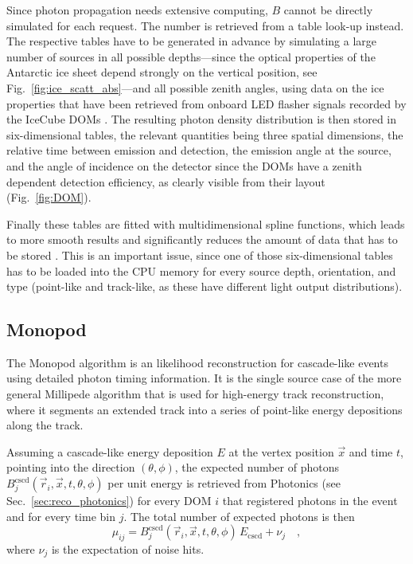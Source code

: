 Since photon propagation needs extensive computing, $B$ cannot be directly
simulated for each request. The number is retrieved from a table look-up
instead. The respective tables have to be generated in advance by simulating a
large number of sources in all possible depths---since the optical properties
of the Antarctic ice sheet depend strongly on the vertical position, see
Fig.~\ref{fig:ice_scatt_abs}---and all possible zenith angles, using data on the
ice properties that have been retrieved from onboard LED flasher signals
recorded by the IceCube DOMs \cite{Dima}. The resulting photon density
distribution is then stored in six-dimensional tables, the relevant quantities
being three spatial dimensions, the relative time between emission and
detection, the emission angle at the source, and the angle of incidence on the
detector since the DOMs have a zenith dependent detection efficiency, as clearly
visible from their layout (Fig.~\ref{fig:DOM}).

Finally these tables are fitted with multidimensional spline functions, which
leads to more smooth results and significantly reduces the amount of data that
has to be stored \cite{Dima}. This is an important issue, since one of those
six-dimensional tables has to be loaded into the CPU memory for every source
depth, orientation, and type (point-like and track-like, as these have
different light output distributions).

\subsection{Monopod}
\label{sec:reco_monopod}

The Monopod algorithm is an likelihood reconstruction for cascade-like events
using detailed photon timing information. It is the single source case of the
more general Millipede algorithm \cite{Millipede} that is used for high-energy
track reconstruction, where it segments an extended track into a series of
point-like energy depositions along the track.

Assuming a cascade-like energy deposition $E$ at the vertex position $\vec{x}$
and time $t$, pointing into the direction $(\theta, \phi)$, the expected number
of photons $B^\mathrm{cscd}_j(\vec{r}_i, \vec{x}, t, \theta, \phi)$ per unit
energy is retrieved from Photonics (see Sec.~\ref{sec:reco_photonics}) for every
DOM $i$ that registered photons in the event and for every time bin $j$. The
total number of expected photons is then
\begin{equation}
 \mu_{ij} = B^\mathrm{cscd}_j(\vec{r}_i, \vec{x}, t, \theta, \phi)
             \,E_\mathrm{cscd} + \nu_j  \quad, \label{eqn:cscd_hypo}
\end{equation}
where $\nu_j$ is the expectation of noise hits.

